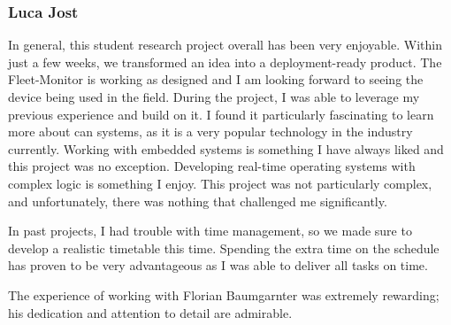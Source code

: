 \subsubsection{Luca Jost}
In general, this student research project overall has been very enjoyable. Within just a few weeks, we transformed an idea into a deployment-ready product. The Fleet-Monitor is working as designed and I am looking forward to seeing the device being used in the field. During the project, I was able to leverage my previous experience and build on it. I found it particularly fascinating to learn more about \acrshort{can} systems, as it is a very popular technology in the industry currently. Working with embedded systems is something I have always liked and this project was no exception. Developing real-time operating systems with complex logic is something I enjoy. This project was not particularly complex, and unfortunately, there was nothing that challenged me significantly.

In past projects, I had trouble with time management, so we made sure to develop a realistic timetable this time. Spending the extra time on the schedule has proven to be very advantageous as I was able to deliver all tasks on time. 

The experience of working with Florian Baumgarnter was extremely rewarding; his dedication and attention to detail are admirable.
